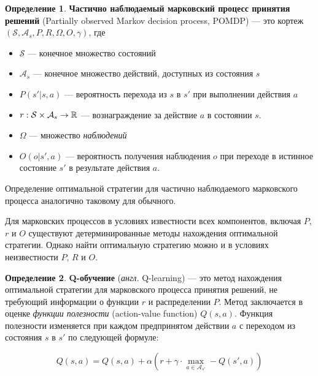 \documentclass[specification,annotation,times]{itmo-student-thesis}
\theoremstyle{definition}
\newtheorem{definition-ru}{Определение}
\begin{document}
\begin{definition-ru}
  \textbf{Частично наблюдаемый марковский процесс принятия решений} (Partially
  observed Markov decision process, POMDP) --- это кортеж
  $(\mathcal{S}, \mathcal{A}_s, P, R, \Omega, O, \gamma)$, где
  \begin{itemize}
  \item $\mathcal{S}$ --- конечное множество состояний
  \item $\mathcal{A}_s$ --- конечное множество действий, доступных из состояния $s$
  \item $P(s' | s, a)$ --- вероятность перехода из $s$ в $s'$ при выполнении
    действия $a$
  \item $r : \mathcal{S} \times \mathcal{A}_s \rightarrow \Bbb{R}$ ---
    вознаграждение за действие $a$ в состоянии $s$.
  \item $\Omega$ --- множество \textit{наблюдений}
  \item $O(o | s', a)$ --- вероятность получения наблюдения $o$ при переходе в
    истинное состояние $s'$ в результате действия $a$. 
  \end{itemize}
\end{definition-ru}

Определение оптимальной стратегии для частично наблюдаемого марковского процесса
аналогично таковому для обычного.

Для марковских процессов в условиях известности всех компонентов, включая $P$,
$r$ и $O$ существуют детерминированные методы нахождения оптимальной стратегии.
Однако найти оптимальную стратегию можно и в условиях неизвестности $P$, $R$ и $O$.

\begin{definition-ru}
  \textbf{Q-обучение} (\textit{англ.} Q-learning) \cite{q-learning-orig} --- это метод нахождения
  оптимальной стратегии для марковского процесса принятия решений, не требующий
  информации о функции $r$ и распределении $P$. Метод заключается в оценке
  \textit{функции полезности} (action-value function)
  $Q(s,a)$. Функция полезности изменяется при каждом предпринятом действии $a$ с
  переходом из состояния $s$ в $s'$ по следующей формуле:

  \begin{equation}\label{eq:q-learning}
    Q(s, a) = Q(s, a) + \alpha \left( r +
    \gamma \cdot \max\limits_{a \in \mathcal{A}_{s'}} - Q(s', a) \right)
  \end{equation}
\end{definition-ru}
\end{document}
